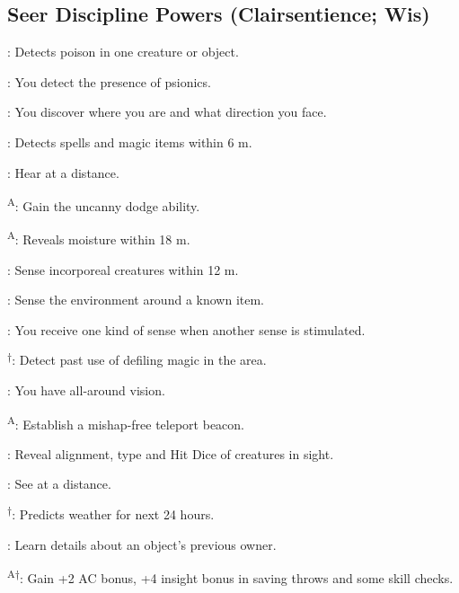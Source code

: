 \subsection{Seer Discipline Powers {\normalsize(Clairsentience; Wis)}}
\begin{enumerate*}
\item {}: Detects poison in one creature or object.

: You detect the presence of psionics.

: You discover where you are and what direction you face.

\item {}: Detects spells and magic items within 6 m. %

\item {}: Hear at a distance.

\textsuperscript{A}: Gain the uncanny dodge ability. %

\textsuperscript{A}: Reveals moisture within 18 m.

: Sense incorporeal creatures within 12 m. %

: Sense the environment around a known item.

: You receive one kind of sense when another sense is stimulated.

\textsuperscript{$\dagger$}: Detect past use of defiling magic in the area.

: You have all-around vision.

\item {}\textsuperscript{A}: Establish a mishap-free teleport beacon.

: Reveal alignment, type and Hit Dice of creatures in sight.

: See at a distance.

\textsuperscript{$\dagger$}: Predicts weather for next 24 hours.

\item {}: Learn details about an object's previous owner.

\textsuperscript{A$\dagger$}: Gain +2 AC bonus, +4 insight bonus in saving throws and some skill checks.


\end{enumerate*}
